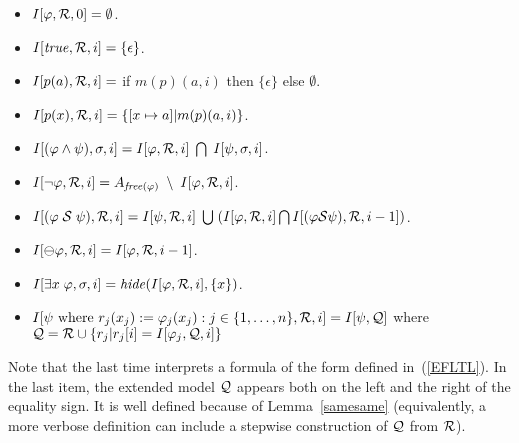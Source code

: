 \documentclass{llncs}
\begin{document}
\begin{itemize}
\item $I [ \varphi , {\cal R} , 0 ] = \emptyset$.
\item $I [ \mathit{true} , {\cal R} , i ] = \{ \epsilon \}$.
\item $I [ p ( a ) , {\cal R} , i ] =$ if $m (p )  ( a , i ) $ then
$\{ \epsilon \}$ else $\emptyset$.
\item $I [ p ( x ) , {\cal R} , i ] = \{ [ x \mapsto a ] | m (p) ( a , i)  \}$.
\item $I [ ( \varphi \wedge \psi ) , \sigma , i ] = 
I [ \varphi , {\cal R} , i ] \;  \bigcap \; I [ \psi , \sigma , i ]$.
\item $I [ \neg \varphi , {\cal R} , i ] = 
A_{\mathit{free} ( \varphi )} \; \setminus \; I [ \varphi , {\cal R} , i ]$.
\item $I [ ( \varphi \; {\cal S} \; \psi ) , {\cal R} , i ] = 
I [ \psi , {\cal R}, i ] \; \bigcup \;
( I [ \varphi , {\cal R} , i ] \bigcap 
I [ (\varphi {\cal S} \psi ) , {\cal R} , i - 1 ] )$.
\item $I [ \ominus \varphi , {\cal R} , i ] = I [ \varphi , {\cal R} , i-1 ]$.
\item $I [ \exists x \; \varphi , \sigma , i ] = 
\mathit{hide} ( I [ \varphi , {\cal R} , i ] , \{ x \} )$.
\item $I [ \psi \mathrm{\ where\ } r_j ( x_j) := 
\varphi_j (x_j) : j \in \{ 1 , \ldots , n \} , {\cal R} , i ] = 
 I [ \psi , {\cal Q} ] $ where ${\cal Q} = {\cal R} \cup
\{ r_j | r_j [ i ] =  I [ 
\varphi_j , {\cal Q} , i ] \}$
\end{itemize}
Note that the last time interprets a formula of
the form defined in~(\ref{EFLTL}).
In the last item, the extended model ${\cal Q}$ appears both on the left and the right of the equality sign. It is well defined because of Lemma~\ref{samesame} (equivalently, a more verbose definition can include a stepwise construction of ${\cal Q}$ from ${\cal R}$).
\end{document}
